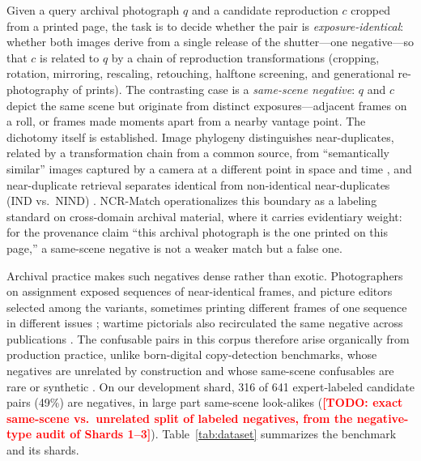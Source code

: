 \documentclass[letterpaper]{article} %
\newcommand{\todo}[1]{\textcolor{red}{\textbf{[TODO: #1]}}}
\begin{document}
Given a query archival photograph $q$ and a candidate reproduction $c$
cropped from a printed page, the task is to decide whether the pair is
\emph{exposure-identical}: whether both images derive from a single release
of the shutter---one negative---so that $c$ is related to $q$ by a chain of
reproduction transformations (cropping, rotation, mirroring, rescaling,
retouching, halftone screening, and generational re-photography of prints).
The contrasting case is a \emph{same-scene negative}: $q$ and $c$ depict the
same scene but originate from distinct exposures---adjacent frames on a roll,
or frames made moments apart from a nearby vantage point. The dichotomy
itself is established. Image phylogeny distinguishes near-duplicates, related
by a transformation chain from a common source, from ``semantically similar''
images captured by a camera at a different point in space and time
\cite{dias2012phylogeny,dias2013forests}, and near-duplicate retrieval
separates identical from non-identical near-duplicates (IND vs.\ NIND)
\cite{chum2007scalable,jindaapiraksa2013california}. NCR-Match
operationalizes this boundary as a labeling standard on cross-domain archival
material, where it carries evidentiary weight: for the provenance claim
``this archival photograph is the one printed on this page,'' a same-scene
negative is not a weaker match but a false one.

Archival practice makes such negatives dense rather than exotic.
Photographers on assignment exposed sequences of near-identical frames, and
picture editors selected among the variants, sometimes printing different
frames of one sequence in different issues \cite{du2025metaphor}; wartime
pictorials also recirculated the same negative across publications
\cite{du2024probing}. The confusable pairs in this corpus therefore arise
organically from production practice, unlike born-digital copy-detection
benchmarks, whose negatives are unrelated by construction and whose
same-scene confusables are rare or synthetic
\cite{douze2021disc,wang2023ndec}. On our development shard, 316 of 641
expert-labeled candidate pairs (49\%) are negatives, in large part same-scene
look-alikes (\todo{exact same-scene vs.\ unrelated split of labeled
negatives, from the negative-type audit of Shards 1--3}).
Table~\ref{tab:dataset} summarizes the benchmark and its shards.
\end{document}
